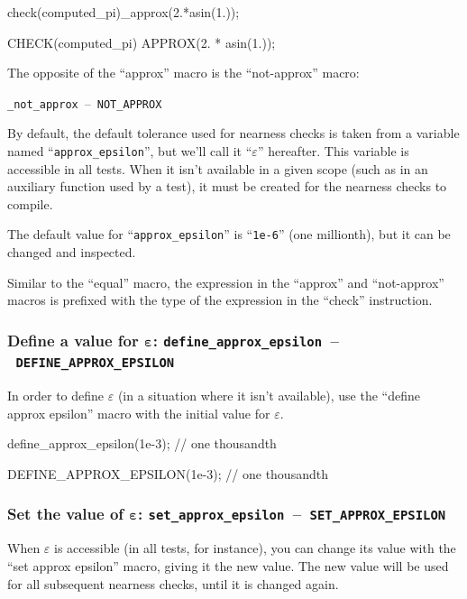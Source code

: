 \documentclass[twoside, a4paper, article]{memoir}
\newcommand*\testudocolor{\color{red!80!blue}}
\newcommand*\testudo[1]{\texttt{\testudocolor{}#1}}
\newcommand*\testudopair[2]{\testudo{#1}~--~\testudo{#2}}
\newcommand\subsubsectiontestudopair[3]{%
  \subsubsection[#1]{#1: \testudopair{#2}{#3}}}
\begin{document}
\begin{cpplisting}
check(computed_pi)_approx(2.*asin(1.));
\end{cpplisting}

\begin{cpplisting}
CHECK(computed_pi) APPROX(2. * asin(1.));
\end{cpplisting}

The opposite of the ``approx'' macro is the ``not-approx'' macro:
\begin{center}
  \testudopair{\_not\_approx}{NOT\_APPROX}
\end{center}

By default, the default tolerance used for nearness checks is taken from a
variable named ``\texttt{approx\_epsilon}'', but we'll call it
``$\varepsilon$'' hereafter.  This variable is accessible in all tests.  When
it isn't available in a given scope (such as in an auxiliary function used by a
test), it must be created for the nearness checks to compile.

The default value for ``\texttt{approx\_epsilon}'' is ``\texttt{1e-6}'' (one
millionth), but it can be changed and inspected.

Similar to the ``equal'' macro, the expression in the ``approx'' and
``not-approx'' macros is prefixed with the type of the expression in the
``check'' instruction.

\subsubsectiontestudopair{Define a value for $\bm{\varepsilon}$}%
  {define\_approx\_epsilon}{DEFINE\_APPROX\_EPSILON}
\label{sec:define-value-epsilon}

In order to define $\varepsilon$ (in a situation where it isn't available), use
the ``define approx epsilon'' macro with the initial value for $\varepsilon$.

\begin{cpplisting}
define_approx_epsilon(1e-3); // one thousandth
\end{cpplisting}

\begin{cpplisting}
DEFINE_APPROX_EPSILON(1e-3); // one thousandth
\end{cpplisting}

\subsubsectiontestudopair{Set the value of $\bm{\varepsilon}$}%
  {set\_approx\_epsilon}{SET\_APPROX\_EPSILON}
\label{sec:set-value-epsilon}

When $\varepsilon$ is accessible (in all tests, for instance), you can change
its value with the ``set approx epsilon'' macro, giving it the new value.  The
new value will be used for all subsequent nearness checks, until it is changed
again.
\end{document}
